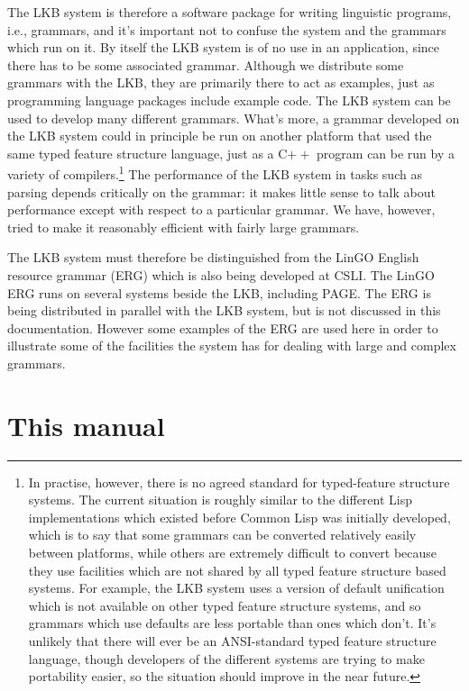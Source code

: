 \documentclass[12pt]{report}
\begin{document}
The LKB system is therefore a software package for writing
linguistic programs, i.e., grammars, and it's
important not to confuse the system and the grammars which run on it. By
itself the LKB system is of no use in an application, since
there has to be some associated grammar.
Although we distribute some grammars with the LKB, they are 
primarily there to act as
examples, just as programming language packages include example code.  
The LKB system can be used to develop many different grammars.
What's more,
a grammar developed on the LKB system could in principle
be run on another platform that used the same typed feature 
structure language, just as a C$++$ program can be run
by a variety of compilers.\footnote{In practise, however, there
is no agreed standard for typed-feature structure systems.
The current situation is roughly similar to the different Lisp implementations
which existed before Common Lisp was initially developed, which is
to say that some grammars can be converted relatively easily between
platforms, while others are extremely difficult to convert because 
they use facilities which are not shared by all typed feature structure
based systems.  For example, the LKB system uses a version of 
default unification
which is not available on other typed feature structure systems,
and so grammars which use defaults are less portable than ones which
don't.  It's unlikely that there will ever be an ANSI-standard
typed feature structure language, though developers of the different
systems are trying to make portability easier, so the situation should
improve in the near future.}  
The performance of the LKB system in tasks such
as parsing depends critically on the grammar: it makes little sense to 
talk about performance except with respect to a 
particular grammar.  We have, however, tried to make it reasonably efficient
with fairly large grammars.

The LKB system
must therefore be distinguished from the LinGO English resource grammar
(ERG) which is also being developed at CSLI.  The LinGO ERG runs on 
several systems beside the LKB, including PAGE.
The ERG is being distributed in parallel with the LKB system,
but is not discussed in this documentation.  However
some examples of the ERG are used here in order
to illustrate some of the facilities the system has for dealing 
with large and complex grammars.

\section{This manual}
\end{document}
